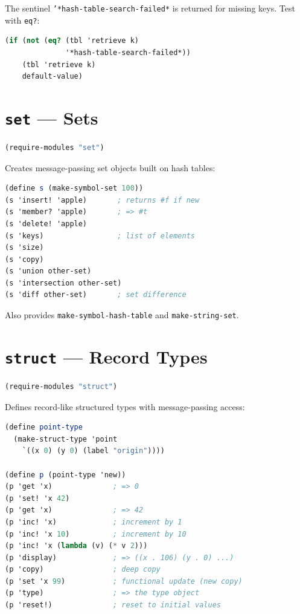 \documentclass[12pt]{report}
\begin{document}
\noindent The sentinel {\tt '*hash-table-search-failed*} is returned
for missing keys.  Test with {\tt eq?}:
\begin{lstlisting}[language=Scheme]
(if (not (eq? (tbl 'retrieve k)
              '*hash-table-search-failed*))
    (tbl 'retrieve k)
    default-value)
\end{lstlisting}

\section{{\tt set} --- Sets}

\begin{lstlisting}[language=Scheme]
(require-modules "set")
\end{lstlisting}

Creates message-passing set objects built on hash tables:

\begin{lstlisting}[language=Scheme]
(define s (make-symbol-set 100))
(s 'insert! 'apple)       ; returns #f if new
(s 'member? 'apple)       ; => #t
(s 'delete! 'apple)
(s 'keys)                 ; list of elements
(s 'size)
(s 'copy)
(s 'union other-set)
(s 'intersection other-set)
(s 'diff other-set)       ; set difference
\end{lstlisting}

Also provides {\tt make-symbol-hash-table} and {\tt make-string-set}.

\section{{\tt struct} --- Record Types}

\begin{lstlisting}[language=Scheme]
(require-modules "struct")
\end{lstlisting}

Defines record-like structured types with message-passing access:

\begin{lstlisting}[language=Scheme]
(define point-type
  (make-struct-type 'point
    `((x 0) (y 0) (label "origin"))))

(define p (point-type 'new))
(p 'get 'x)              ; => 0
(p 'set! 'x 42)
(p 'get 'x)              ; => 42
(p 'inc! 'x)             ; increment by 1
(p 'inc! 'x 10)          ; increment by 10
(p 'inc! 'x (lambda (v) (* v 2)))
(p 'display)             ; => ((x . 106) (y . 0) ...)
(p 'copy)                ; deep copy
(p 'set 'x 99)           ; functional update (new copy)
(p 'type)                ; => the type object
(p 'reset!)              ; reset to initial values
\end{lstlisting}
\end{document}
